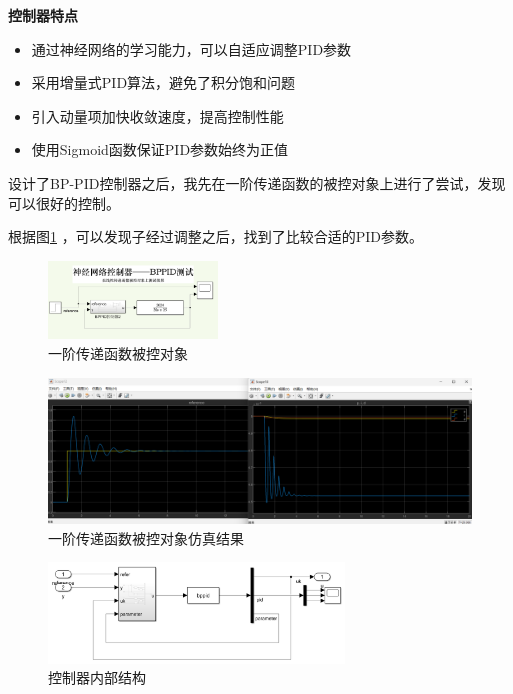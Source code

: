 \documentclass[12pt,a4paper,UTF8]{article}
\begin{document}
\textbf{控制器特点}

\begin{itemize}
\item 通过神经网络的学习能力，可以自适应调整PID参数
\item 采用增量式PID算法，避免了积分饱和问题
\item 引入动量项加快收敛速度，提高控制性能
\item 使用Sigmoid函数保证PID参数始终为正值
\end{itemize}


设计了BP-PID控制器之后，我先在一阶传递函数的被控对象上进行了尝试，发现可以很好的控制。

根据图\ref{fig:one_order_system} ，可以发现子经过调整之后，找到了比较合适的PID参数。

\begin{figure}[htbp] \centering \includegraphics[width=0.4\textwidth]{2024-12-30-13-35-29.png} \caption{一阶传递函数被控对象}\end{figure}

\begin{figure}[htbp] \centering \includegraphics[width=\textwidth]{2024-12-30-13-36-45.png} \caption{一阶传递函数被控对象仿真结果}\label{fig:one_order_system}\end{figure}


\begin{figure}[htbp] \centering \includegraphics[width=0.7\textwidth]{2024-12-30-13-33-09.png} \caption{控制器内部结构}\end{figure}
\end{document}
